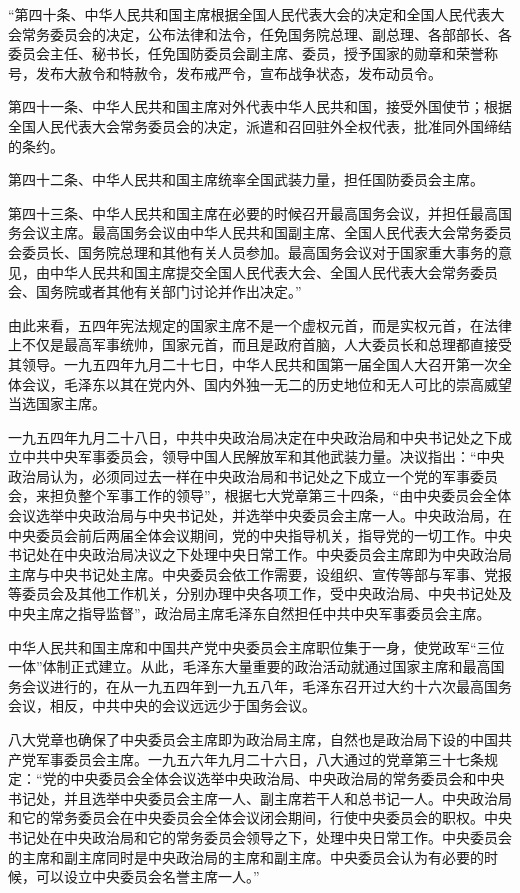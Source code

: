 \begin{maonote}
“第四十条、中华人民共和国主席根据全国人民代表大会的决定和全国人民代表大会常务委员会的决定，公布法律和法令，任免国务院总理、副总理、各部部长、各委员会主任、秘书长，任免国防委员会副主席、委员，授予国家的勋章和荣誉称号，发布大赦令和特赦令，发布戒严令，宣布战争状态，发布动员令。

第四十一条、中华人民共和国主席对外代表中华人民共和国，接受外国使节；根据全国人民代表大会常务委员会的决定，派遣和召回驻外全权代表，批准同外国缔结的条约。

第四十二条、中华人民共和国主席统率全国武装力量，担任国防委员会主席。

第四十三条、中华人民共和国主席在必要的时候召开最高国务会议，并担任最高国务会议主席。最高国务会议由中华人民共和国副主席、全国人民代表大会常务委员会委员长、国务院总理和其他有关人员参加。最高国务会议对于国家重大事务的意见，由中华人民共和国主席提交全国人民代表大会、全国人民代表大会常务委员会、国务院或者其他有关部门讨论并作出决定。”

由此来看，五四年宪法规定的国家主席不是一个虚权元首，而是实权元首，在法律上不仅是最高军事统帅，国家元首，而且是政府首脑，人大委员长和总理都直接受其领导。一九五四年九月二十七日，中华人民共和国第一届全国人大召开第一次全体会议，毛泽东以其在党内外、国内外独一无二的历史地位和无人可比的崇高威望当选国家主席。

一九五四年九月二十八日，中共中央政治局决定在中央政治局和中央书记处之下成立中共中央军事委员会，领导中国人民解放军和其他武装力量。决议指出：“中央政治局认为，必须同过去一样在中央政治局和书记处之下成立一个党的军事委员会，来担负整个军事工作的领导”，根据七大党章第三十四条，“由中央委员会全体会议选举中央政治局与中央书记处，并选举中央委员会主席一人。中央政治局，在中央委员会前后两届全体会议期间，党的中央指导机关，指导党的一切工作。中央书记处在中央政治局决议之下处理中央日常工作。中央委员会主席即为中央政治局主席与中央书记处主席。中央委员会依工作需要，设组织、宣传等部与军事、党报等委员会及其他工作机关，分别办理中央各项工作，受中央政治局、中央书记处及中央主席之指导监督”，政治局主席毛泽东自然担任中共中央军事委员会主席。

中华人民共和国主席和中国共产党中央委员会主席职位集于一身，使党政军“三位一体”体制正式建立。从此，毛泽东大量重要的政治活动就通过国家主席和最高国务会议进行的，在从一九五四年到一九五八年，毛泽东召开过大约十六次最高国务会议，相反，中共中央的会议远远少于国务会议。

八大党章也确保了中央委员会主席即为政治局主席，自然也是政治局下设的中国共产党军事委员会主席。一九五六年九月二十六日，八大通过的党章第三十七条规定：“党的中央委员会全体会议选举中央政治局、中央政治局的常务委员会和中央书记处，并且选举中央委员会主席一人、副主席若干人和总书记一人。中央政治局和它的常务委员会在中央委员会全体会议闭会期间，行使中央委员会的职权。中央书记处在中央政治局和它的常务委员会领导之下，处理中央日常工作。中央委员会的主席和副主席同时是中央政治局的主席和副主席。中央委员会认为有必要的时候，可以设立中央委员会名誉主席一人。”


\end{maonote}
